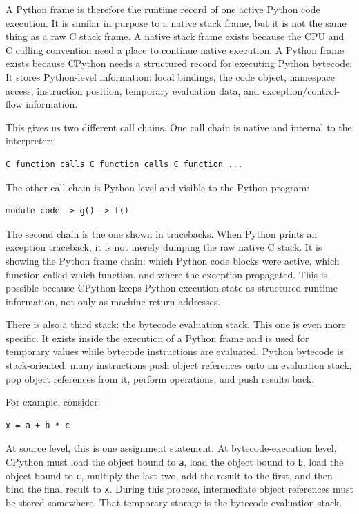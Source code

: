 A Python frame is therefore the runtime record of one active Python code execution. It is similar in purpose to a native stack frame, but it is not the same thing as a raw C stack frame. A native stack frame exists because the CPU and C calling convention need a place to continue native execution. A Python frame exists because CPython needs a structured record for executing Python bytecode. It stores Python-level information: local bindings, the code object, namespace access, instruction position, temporary evaluation data, and exception/control-flow information.

This gives us two different call chains. One call chain is native and internal to the interpreter:

\begin{verbatim}
C function calls C function calls C function ...
\end{verbatim}

The other call chain is Python-level and visible to the Python program:

\begin{verbatim}
module code -> g() -> f()
\end{verbatim}

The second chain is the one shown in tracebacks. When Python prints an exception traceback, it is not merely dumping the raw native C stack. It is showing the Python frame chain: which Python code blocks were active, which function called which function, and where the exception propagated. This is possible because CPython keeps Python execution state as structured runtime information, not only as machine return addresses.

There is also a third stack: the bytecode evaluation stack. This one is even more specific. It exists inside the execution of a Python frame and is used for temporary values while bytecode instructions are evaluated. Python bytecode is stack-oriented: many instructions push object references onto an evaluation stack, pop object references from it, perform operations, and push results back.

For example, consider:

\begin{verbatim}
x = a + b * c
\end{verbatim}

At source level, this is one assignment statement. At bytecode-execution level, CPython must load the object bound to \texttt{a}, load the object bound to \texttt{b}, load the object bound to \texttt{c}, multiply the last two, add the result to the first, and then bind the final result to \texttt{x}. During this process, intermediate object references must be stored somewhere. That temporary storage is the bytecode evaluation stack.

